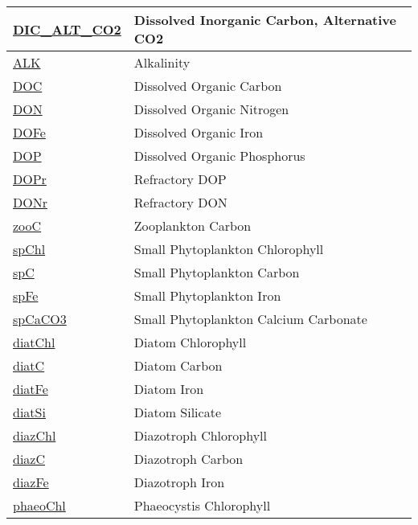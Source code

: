{\begin{center}
\begin{longtable}{| p{2.0in} | p{4.0in} |}
    \hline
    \hyperref[subsec:var_sec_state_DIC_ALT_CO2]{DIC\_ALT\_CO2} & Dissolved Inorganic Carbon, Alternative CO2 \\
    \hline
    \hyperref[subsec:var_sec_state_ALK]{ALK} & Alkalinity \\
    \hline
    \hyperref[subsec:var_sec_state_DOC]{DOC} & Dissolved Organic Carbon \\
    \hline
    \hyperref[subsec:var_sec_state_DON]{DON} & Dissolved Organic Nitrogen \\
    \hline
    \hyperref[subsec:var_sec_state_DOFe]{DOFe} & Dissolved Organic Iron \\
    \hline
    \hyperref[subsec:var_sec_state_DOP]{DOP} & Dissolved Organic Phosphorus \\
    \hline
    \hyperref[subsec:var_sec_state_DOPr]{DOPr} & Refractory DOP \\
    \hline
    \hyperref[subsec:var_sec_state_DONr]{DONr} & Refractory DON \\
    \hline
    \hyperref[subsec:var_sec_state_zooC]{zooC} & Zooplankton Carbon \\
    \hline
    \hyperref[subsec:var_sec_state_spChl]{spChl} & Small Phytoplankton Chlorophyll \\
    \hline
    \hyperref[subsec:var_sec_state_spC]{spC} & Small Phytoplankton Carbon \\
    \hline
    \hyperref[subsec:var_sec_state_spFe]{spFe} & Small Phytoplankton Iron \\
    \hline
    \hyperref[subsec:var_sec_state_spCaCO3]{spCaCO3} & Small Phytoplankton Calcium Carbonate \\
    \hline
    \hyperref[subsec:var_sec_state_diatChl]{diatChl} & Diatom Chlorophyll \\
    \hline
    \hyperref[subsec:var_sec_state_diatC]{diatC} & Diatom Carbon \\
    \hline
    \hyperref[subsec:var_sec_state_diatFe]{diatFe} & Diatom Iron \\
    \hline
    \hyperref[subsec:var_sec_state_diatSi]{diatSi} & Diatom Silicate \\
    \hline
    \hyperref[subsec:var_sec_state_diazChl]{diazChl} & Diazotroph Chlorophyll \\
    \hline
    \hyperref[subsec:var_sec_state_diazC]{diazC} & Diazotroph Carbon \\
    \hline
    \hyperref[subsec:var_sec_state_diazFe]{diazFe} & Diazotroph Iron \\
    \hline
    \hyperref[subsec:var_sec_state_phaeoChl]{phaeoChl} & Phaeocystis Chlorophyll \\

\end{longtable}
\end{center}}
